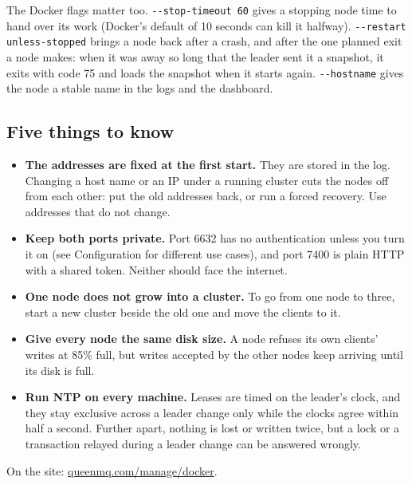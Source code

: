 The Docker flags matter too. \texttt{-{}-stop-timeout 60} gives a stopping node time to hand over
its work (Docker's default of 10 seconds can kill it halfway). \texttt{-{}-restart unless-stopped}
brings a node back after a crash, and after the one planned exit a node makes: when it was away so
long that the leader sent it a snapshot, it exits with code 75 and loads the snapshot when it starts
again. \texttt{-{}-hostname} gives the node a stable name in the logs and the dashboard.


\subsection{Five things to know}

\begin{itemize}
\item \textbf{The addresses are fixed at the first start.} They are stored in the log. Changing a
host name or an IP under a running cluster cuts the nodes off from each other: put the old
addresses back, or run a forced recovery. Use addresses that do not change.
\item \textbf{Keep both ports private.} Port 6632 has no authentication unless you turn it on (see
Configuration for different use cases), and port 7400 is plain HTTP with a shared token. Neither
should face the internet.
\item \textbf{One node does not grow into a cluster.} To go from one node to three, start a new
cluster beside the old one and move the clients to it.
\item \textbf{Give every node the same disk size.} A node refuses its own clients' writes at 85\%
full, but writes accepted by the other nodes keep arriving until its disk is full.
\item \textbf{Run NTP on every machine.} Leases are timed on the leader's clock, and they stay
exclusive across a leader change only while the clocks agree within half a second. Further apart,
nothing is lost or written twice, but a lock or a transaction relayed during a leader change can be
answered wrongly.
\end{itemize}

On the site: \href{https://queenmq.com/manage/docker/}{queenmq.com/manage/docker}.
